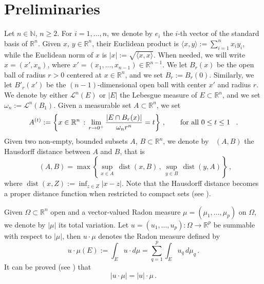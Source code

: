 \documentclass[a4paper,reqno,11pt]{amsart}
\newcommand{\R}{\mathbb{R}}
\newcommand{\ra}{\rightarrow}
\newcommand{\Leb}{{\mathcal L}} %
\newcommand{\dist}{\mathop{\mathrm{dist}}}
\newcommand{\Hdist}{\mathop{\mathrm{dist}_{\mathcal{H}}}}
\begin{document}
\section{Preliminaries}
Let $n \in \mathbb{N}$, $n \geq 2$. For $i = 1,...,n$, we denote by $e_{i}$ the $i$-th vector of the standard basis of $\R^{n}$. Given $x$, $y \in \R^{n}$, their Euclidean product is $\langle x, y \rangle := \sum_{i=1}^{n} x_{i} y_{i}$, while the Euclidean norm of $x$ is $|x| := \sqrt{\langle x, x \rangle}$. When needed, we will write $x = (x',x_{n})$, where $x' = (x_{1}, ..., x_{n-1}) \in \R^{n-1}$. We let $B_{r}(x)$ be the open ball of radius $r>0$ centered at $x\in \R^{n}$, and we set $B_{r} := B_{r}(0)$. 
Similarly, we let $B'_{r}(x')$ be the $(n-1)$-dimensional open ball with center $x'$ and radius $r$. We denote by either $\Leb^{n}(E)$ or $|E|$ the Lebesgue measure of $E\subset \R^{n}$, and we set $\omega_{n} := \Leb^{n}(B_{1})$.  
Given a measurable set $A \subset \R^n$, we set
\begin{equation*}
A^{(t)} := \left \{ x \in \R^n \, : \, \lim_{r \ra 0^+} \dfrac{|E \cap B_{r}(x)|}{\omega_n r^n} = t \right \} \, , \qquad \text{for all $0 \leq t \leq 1$ \, .}
\end{equation*}
Given two non-empty, bounded subsets $A$, $B \subset \R^{n}$, we denote by $\Hdist(A,B)$ the Hausdorff distance between $A$ and $B$, that is
\begin{equation*} %
    \Hdist(A,B) = \max \left\{ \sup_{x \in A} \, \dist(x,B) \, , \, \sup_{y \in B} \, \dist(y,A) \right\} \, ,
\end{equation*}
where $\dist(x,Z) := \inf_{z \in Z} |x - z|$. Note that the Hausdorff distance becomes a proper distance function when restricted to compact sets (see \cite{Rockafellar1998}).

Given $\Omega \subset \R^{n}$ open and a vector-valued Radon measure $\mu = (\mu_{1},...,\mu_{p})$ on $\Omega$, we denote by $|\mu|$ its total variation. Let $u = (u_{1},...,u_{p}): \Omega \rightarrow \R^{p}$ be summable with respect to $|\mu|$, then $u \cdot \mu$ denotes the Radon measure defined by
\begin{equation*}
	u \cdot \mu (E) := \int_{E} u \cdot d\mu = \sum_{q = 1}^{p} \int_{E} u_{q}\, d\mu_{q} \, .
\end{equation*}
It can be proved (see \cite[Proposition 1.23]{AmbrosioFuscoPallara2000}) that
\begin{equation*} %
	|u \cdot \mu| = |u| \cdot \mu \, .
\end{equation*}
\end{document}
